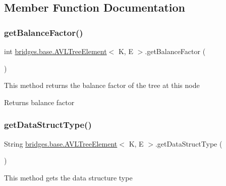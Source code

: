 \subsection{Member Function Documentation}
\mbox{\label{classbridges_1_1base_1_1_a_v_l_tree_element_a0478ca0351cd714e8f7b8e49703990c8}} 
\subsubsection{\texorpdfstring{get\+Balance\+Factor()}{getBalanceFactor()}}
{\footnotesize\ttfamily int \mbox{\hyperlink{classbridges_1_1base_1_1_a_v_l_tree_element}{bridges.\+base.\+A\+V\+L\+Tree\+Element}}$<$ K, E $>$.get\+Balance\+Factor (\begin{DoxyParamCaption}{ }\end{DoxyParamCaption})}

This method returns the balance factor of the tree at this node

\begin{DoxyReturn}{Returns}
balance factor 
\end{DoxyReturn}
\mbox{\label{classbridges_1_1base_1_1_a_v_l_tree_element_abdd9e63de10732ef46bd5d531bd7f9d8}} 
\subsubsection{\texorpdfstring{get\+Data\+Struct\+Type()}{getDataStructType()}}
{\footnotesize\ttfamily String \mbox{\hyperlink{classbridges_1_1base_1_1_a_v_l_tree_element}{bridges.\+base.\+A\+V\+L\+Tree\+Element}}$<$ K, E $>$.get\+Data\+Struct\+Type (\begin{DoxyParamCaption}{ }\end{DoxyParamCaption})}

This method gets the data structure type

